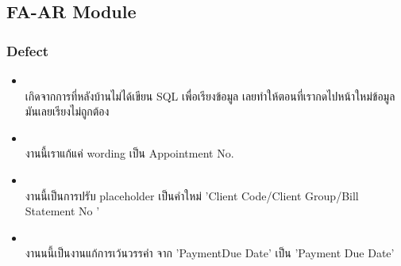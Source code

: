 \subsection{FA-AR Module}

\subsubsection{Defect}
\begin{itemize}
    \setlength\itemsep{1em}
    \item \textbf{} \\
          เกิดจากการที่หลังบ้านไม่ได้เขียน SQL เพื่อเรียงข้อมูล เลยทำให้ตอนที่เรากดไปหน้าใหม่ข้อมูลมันเลยเรียงไม่ถูกต้อง
    \item \textbf{} \\
          งานนี้เราแก้แค่ wording เป็น Appointment No.     
    \item \textbf{} \\
          งานนี้เป็นการปรับ placeholder เป็นคำใหม่ 'Client Code/Client Group/Bill Statement No '
    \item \textbf{} \\
          งานนนี้เป็นงานแก้การเว้นวรรคำ จาก 'PaymentDue Date' เป็น 'Payment Due Date'
\end{itemize}
